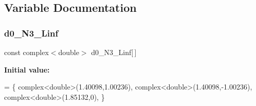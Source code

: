 \subsection{Variable Documentation}
\mbox{\label{IIRGausDeriv_8cpp_a8c8a923a255f7d1433ccbb5ca69e6848}} 
\subsubsection{\texorpdfstring{d0\+\_\+\+N3\+\_\+\+Linf}{d0\_N3\_Linf}}
{\footnotesize\ttfamily const complex$<$double$>$ d0\+\_\+\+N3\+\_\+\+Linf\mbox{[}$\,$\mbox{]}}

{\bfseries Initial value\+:}
\begin{DoxyCode}
= \{
    complex<double>(1.40098,1.00236),
    complex<double>(1.40098,-1.00236),
    complex<double>(1.85132,0),
\}
\end{DoxyCode}
